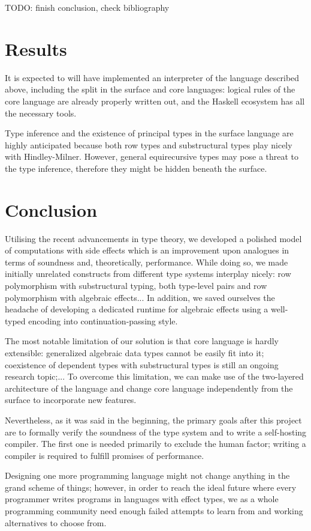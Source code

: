 \documentclass[a4paper,14pt]{extreport}
\begin{document}
TODO: finish conclusion, check bibliography

\section{Results}

It is expected to will have implemented an interpreter of the language described
above, including the split in the surface and core languages: logical rules of
the core language are already properly written out, and the Haskell ecosystem
has all the necessary tools.

Type inference and the existence of principal types in the surface language are
highly anticipated because both row types and substructural types play nicely
with Hindley-Milner. However, general equirecursive types may pose a threat to
the type inference, therefore they might be hidden beneath the surface.

\section{Conclusion}

Utilising the recent advancements in type theory, we developed a polished model
of computations with side effects which is an improvement upon analogues in
terms of soundness and, theoretically, performance. While doing so, we made
initially unrelated constructs from different type systems interplay nicely: row
polymorphism with substructural typing, both type-level pairs and row
polymorphism with algebraic effects... In addition, we saved ourselves the
headache of developing a dedicated runtime for algebraic effects using a
well-typed encoding into continuation-passing style.

The most notable limitation of our solution is that core language is hardly
extensible: generalized algebraic data types cannot be easily fit into it;
coexistence of dependent types with substructural types is still an ongoing
research topic;... To overcome this limitation, we can make use of the
two-layered architecture of the language and change core language independently
from the surface to incorporate new features.

Nevertheless, as it was said in the beginning, the primary goals after this
project are to formally verify the soundness of the type system and to write a
self-hosting compiler. The first one is needed primarily to exclude the human
factor; writing a compiler is required to fulfill promises of performance.

Designing one more programming language might not change anything in the grand
scheme of things; however, in order to reach the ideal future where every
programmer writes programs in languages with effect types, we as a whole
programming community need enough failed attempts to learn from and working
alternatives to choose from.



\end{document}
